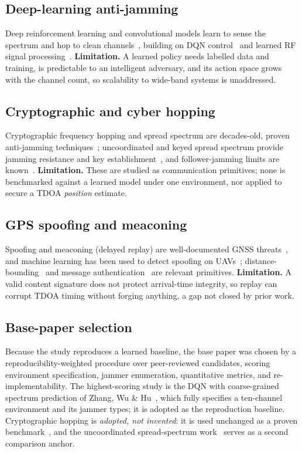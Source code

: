 \documentclass[11pt]{article}
\begin{document}
\subsection{Deep-learning anti-jamming}
Deep reinforcement learning and convolutional models learn to sense the spectrum
and hop to clean channels~\cite{ref11,ref12,ref13,ref31}, building on DQN
control~\cite{ref35} and learned RF signal processing~\cite{ref33,ref34}.
\textbf{Limitation.} A learned policy needs labelled data and training, is
predictable to an intelligent adversary, and its action space grows with the
channel count, so scalability to wide-band systems is unaddressed.

\subsection{Cryptographic and cyber hopping}
Cryptographic frequency hopping and spread spectrum are decades-old, proven
anti-jamming techniques~\cite{ref1,ref4,ref5,ref32}; uncoordinated and keyed
spread spectrum provide jamming resistance and key
establishment~\cite{ref2,ref16}, and follower-jamming limits are
known~\cite{ref3}. \textbf{Limitation.} These are studied as communication
primitives; none is benchmarked against a learned model under one environment,
nor applied to secure a TDOA \emph{position} estimate.

\subsection{GPS spoofing and meaconing}
Spoofing and meaconing (delayed replay) are well-documented GNSS
threats~\cite{ref24,ref25}, and machine learning has been used to detect
spoofing on UAVs~\cite{ref14}; distance-bounding~\cite{ref23} and message
authentication~\cite{ref21} are relevant primitives. \textbf{Limitation.} A
valid content signature does not protect arrival-time integrity, so replay can
corrupt TDOA timing without forging anything, a gap not closed by prior work.

\subsection{Base-paper selection}\label{sec:base}
Because the study reproduces a learned baseline, the base paper was chosen by a
reproducibility-weighted procedure over peer-reviewed candidates, scoring
environment specification, jammer enumeration, quantitative metrics, and
re-implementability. The highest-scoring study is the DQN with coarse-grained
spectrum prediction of Zhang, Wu \& Hu~\cite{ref11}, which fully specifies a
ten-channel environment and its jammer types; it is adopted as the reproduction
baseline. Cryptographic hopping is \emph{adopted, not invented}: it is used
unchanged as a proven benchmark~\cite{ref1,ref2}, and the uncoordinated
spread-spectrum work~\cite{ref2,ref16} serves as a second comparison anchor.
\end{document}
